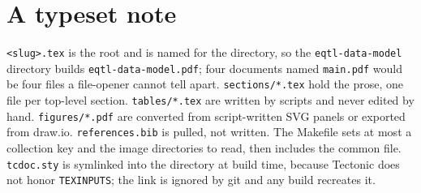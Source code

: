 
\section{A typeset note}
\label{sec:notes}


\texttt{<slug>.tex} is the root and is named for the directory, so the
\texttt{eqtl-data-model} directory builds \texttt{eqtl-data-model.pdf}; four
documents named \texttt{main.pdf} would be four files a file-opener cannot tell
apart. \texttt{sections/*.tex} hold the prose, one file per top-level section.
\texttt{tables/*.tex} are written by scripts and never edited by hand.
\texttt{figures/*.pdf} are converted from script-written SVG panels or exported
from draw.io. \texttt{references.bib} is pulled, not written. The Makefile sets at
most a collection key and the image directories to read, then includes the common
file. \texttt{tcdoc.sty} is symlinked into the directory at build time, because
Tectonic does not honor \texttt{TEXINPUTS}; the link is ignored by git and any
build recreates it.

